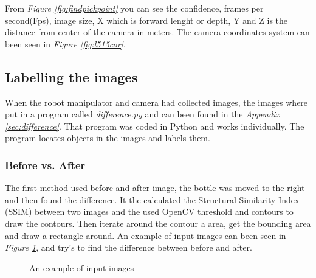 From \textit{Figure \ref{fig:findpickpoint}} you can see the confidence, frames per second(Fps), image size, X which is forward lenght or depth, Y and Z is the distance from center of the camera in meters. 
The camera coordinates system can been seen in \textit{Figure \ref{fig:l515cor}}.


\subsection{Labelling the images}\label{labelimg}
When the robot manipulator and camera had collected images, the images where put in a program called \textit{difference.py} and can been found in the \textit{Appendix \ref{sec:difference}}. That program was coded in Python and works individually. The program locates objects in the images and labels them. 
\subsubsection*{Before vs. After}\label{beforeandafter}
The first method used before and after image, the bottle was moved to the right and then found the difference. It the calculated the Structural Similarity Index (SSIM) between two images and the used OpenCV threshold and contours to draw the contours. Then iterate around the contour a area, get the bounding area and draw a rectangle around.
An example of input images can been seen in \textit{Figure \ref{figure: beforeafter}}, and try's to find the difference between before and after.
\begin{figure}[h]
    \centering
    \hfill
    \caption{An example of input images}
    \label{figure: beforeafter}
\end{figure}

